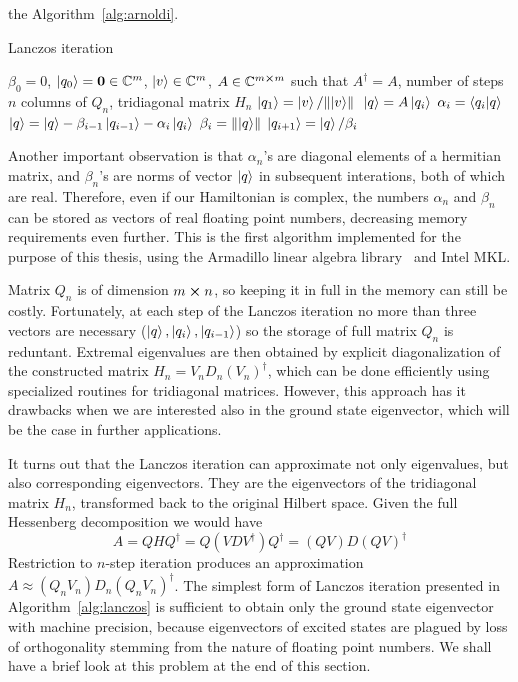 the Algorithm~\ref{alg:arnoldi}.
\begin{algorithm}
	\algrenewcommand{}
	\algrenewcommand{}
	\caption{Lanczos iteration}
	\label{alg:lanczos}
	\begin{algorithmic}[1]
		\Require \(\beta_0 = 0\), \(\ket{q_0} = \vectorbold{0} \in \CC^m\), \(\ket{v} \in \mathbb{C}^m\), \(A \in \mathbb{C}^{m\cross m}\) such that \(A^{\dagger} = A\), number of steps \(n\)
		\Ensure columns of \(Q_n\), tridiagonal matrix \(H_n\)
		\State \(\ket{q_1} = \ket{v}/\norm*{\ket{v}}\)
			\State \(\ket{q} = A\ket{q_i}\)
			\State \(\alpha_i = \braket{q_i}{q}\)
			\State \(\ket{q} = \ket{q} - \beta_{i-1}\ket{q_{i-1}} - \alpha_i \ket{q_i}\)
			\State \(\beta_i = \norm{\ket{q}} \) 
			\State \(\ket{q_{i+1}} = \ket{q}/\beta_i \)
		\EndFor
	\end{algorithmic}
\end{algorithm}
Another important observation is that \(\alpha_n\)'s are diagonal elements of a hermitian matrix, and \(\beta_n\)'s are
norms of vector \(\ket{q}\) in subsequent interations, both of which are real. Therefore, even if our Hamiltonian is
complex, the numbers \(\alpha_n\) and \(\beta_n\) can be stored as vectors of real floating point numbers, decreasing
memory requirements even further. This is the first algorithm implemented for the purpose of this thesis, using
the Armadillo linear algebra library~\autocite{Sanderson2016} and Intel MKL.

Matrix \(Q_n\) is of dimension \(m \cross n\), so keeping it in full in the memory can still be costly. Fortunately,
at each step of the Lanczos iteration no more than three vectors are necessary (\(\ket{q},\ket{q_i},\ket{q_{i-1}}\))
so the storage of full matrix \(Q_n\) is reduntant. Extremal eigenvalues are then obtained by explicit diagonalization
of the constructed matrix \(H_n = V_n D_n (V_n)^{\dagger}\), which can be done efficiently using specialized routines
for tridiagonal matrices. However, this approach has it drawbacks when we are interested also in the ground state
eigenvector, which will be the case in further applications. 

It turns out that the Lanczos iteration can approximate not only eigenvalues,
but also corresponding eigenvectors. They are the eigenvectors of the tridiagonal matrix \(H_n\), transformed back
to the original Hilbert space. Given the full Hessenberg decomposition we would have
\begin{equation}
	A = Q H Q^{\dagger} = Q (VDV^{\dagger}) Q^{\dagger} = (QV)D(QV)^{\dagger}
	\label{eq:factorization}
\end{equation}
Restriction to \(n\)-step iteration produces an approximation \(A\approx (Q_n V_n)D_n(Q_n V_n)^{\dagger}\).
The simplest form of Lanczos iteration presented in Algorithm~\ref{alg:lanczos} is sufficient to obtain
only the ground state eigenvector with machine precision, because eigenvectors of excited states are plagued
by loss of orthogonality stemming from the nature of floating point numbers. We shall have a brief look at this problem
at the end of this section.

